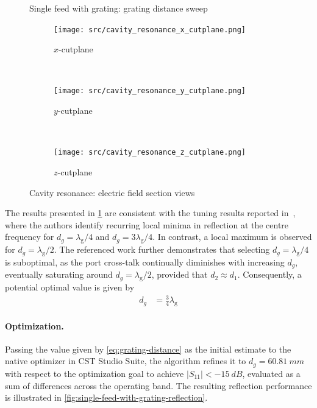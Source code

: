 \documentclass[11pt,a4paper,twoside,openany]{report}
\begin{document}
\begin{figure}[bh]
    \centering
    
    \caption{\label{fig:grating-distance-sweep}Single feed with grating: grating distance sweep}
\end{figure}

\begin{figure}[th]
    \centering
    \begin{subfigure}{.3\textwidth}
        \centering
        \texttt{[image: src/cavity\_resonance\_x\_cutplane.png]}
        \caption{\label{fig:cavity-resonance-x-cutplane}$x$-cutplane}
    \end{subfigure}
    ~
    \begin{subfigure}{.3\textwidth}
        \centering
        \texttt{[image: src/cavity\_resonance\_y\_cutplane.png]}
        \caption{\label{fig:cavity-resonance-y-cutplane}$y$-cutplane}
    \end{subfigure}
    ~
    \begin{subfigure}{.3\textwidth}
        \centering
        \texttt{[image: src/cavity\_resonance\_z\_cutplane.png]}
        \caption{\label{fig:cavity-resonance-z-cutplane}$z$-cutplane}
    \end{subfigure}
    \caption{\label{fig:cavity-resonant}Cavity resonance: electric field section views}
\end{figure}

The results presented in \cref{fig:grating-distance-sweep} are consistent with the tuning results reported in~\parencite{karki-et-al:dual-polarized-probe-for-planar-near-field-measurement}, where the authors identify recurring local minima in reflection at the centre frequency for $d_g = \lambda_{\mathrm g}/4$ and $d_g = 3\lambda_{\mathrm g}/4$. In contrast, a local maximum is observed for $d_g = \lambda_{\mathrm g}/2$. The referenced work further demonstrates that selecting $d_g = \lambda_{\mathrm g}/4$ is suboptimal, as the port cross-talk continually diminishes with increasing $d_g$, eventually saturating around $d_g = \lambda_{\mathrm g}/2$, provided that $d_2\approx d_1$. Consequently, a potential optimal value is given by
\begin{align}
    \label{eq:grating-distance}
    d_g &= \frac{3}{4}\lambda_{\mathrm g}
\end{align}

\paragraph{Optimization.} Passing the value given by \cref{eq:grating-distance} as the initial estimate to the native optimizer in CST Studio Suite, the algorithm refines it to $d_g = \qty{60.81}{mm}$ with respect to the optimization goal to achieve $|S_{11}| < -\qty{15}{dB}$, evaluated as a sum of differences across the operating band. The resulting reflection performance is illustrated in \cref{fig:single-feed-with-grating-reflection}.
\end{document}
